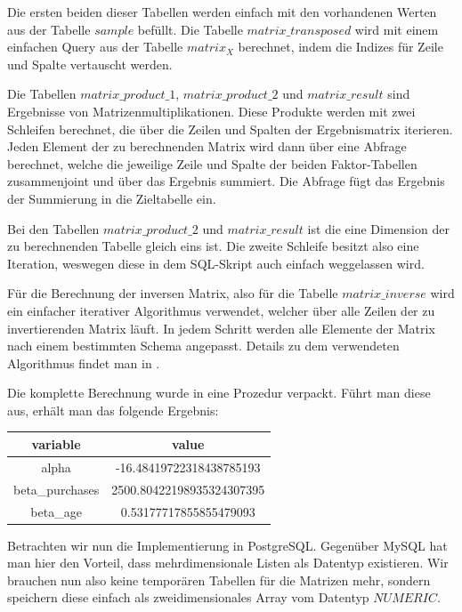 Die ersten beiden dieser Tabellen werden einfach mit den vorhandenen Werten aus der Tabelle $sample$ befüllt. Die Tabelle $matrix\_transposed$ wird mit einem einfachen Query aus der Tabelle $matrix_X$ berechnet, indem die Indizes für Zeile und Spalte vertauscht werden.

Die Tabellen $matrix\_product\_1$, $matrix\_product\_2$ und $matrix\_result$ sind Ergebnisse von Matrizenmultiplikationen. Diese Produkte werden mit zwei Schleifen berechnet, die über die Zeilen und Spalten der Ergebnismatrix iterieren. Jeden Element der zu berechnenden Matrix wird dann über eine Abfrage berechnet, welche die jeweilige Zeile und Spalte der beiden Faktor-Tabellen zusammenjoint und über das Ergebnis summiert. Die Abfrage fügt das Ergebnis der Summierung in die Zieltabelle ein.

Bei den Tabellen $matrix\_product\_2$ und $matrix\_result$ ist die eine Dimension der zu berechnenden Tabelle gleich eins ist. Die zweite Schleife besitzt also eine Iteration, weswegen diese in dem SQL-Skript auch einfach weggelassen wird.

Für die Berechnung der inversen Matrix, also für die Tabelle $matrix\_inverse$ wird ein einfacher iterativer Algorithmus verwendet, welcher über alle Zeilen der zu invertierenden Matrix läuft. In jedem Schritt werden alle Elemente der Matrix nach einem bestimmten Schema angepasst. Details zu dem verwendeten Algorithmus findet man in \cite{matrix}.

Die komplette Berechnung wurde in eine Prozedur verpackt. Führt man diese aus, erhält man das folgende Ergebnis:

\begin{center}
  \begin{tabular}{|c|c|}\hline
    \textbf{variable} & \textbf{value} \\ \hline
    alpha & -16.48419722318438785193 \\ \hline
    beta\_purchases & 2500.80422198935324307395 \\ \hline
    beta\_age & 0.53177717855855479093 \\ \hline
  \end{tabular}
\end{center}

Betrachten wir nun die Implementierung in PostgreSQL. Gegenüber MySQL hat man hier den Vorteil, dass mehrdimensionale Listen als Datentyp existieren. Wir brauchen nun also keine temporären Tabellen für die Matrizen mehr, sondern speichern diese einfach als zweidimensionales Array vom Datentyp $NUMERIC$.

